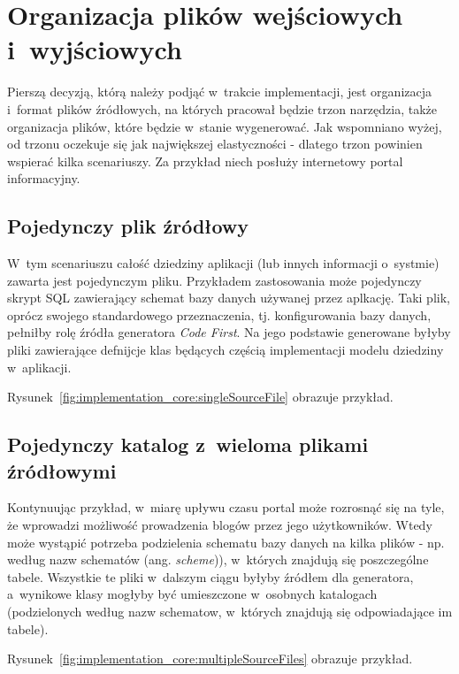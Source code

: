 \section{Organizacja plików wejściowych i~wyjściowych}

Pierszą decyzją, którą należy podjąć w~trakcie implementacji, jest organizacja i~format plików źródłowych, na których pracował będzie trzon narzędzia, także organizacja plików, które będzie w~stanie wygenerować.
Jak wspomniano wyżej, od trzonu oczekuje się jak największej elastyczności - dlatego trzon powinien wspierać kilka scenariuszy.
Za przykład niech posłuży internetowy portal informacyjny.


\subsection{Pojedynczy plik źródłowy}

W~tym scenariuszu całość dziedziny aplikacji (lub innych informacji o~systmie) zawarta jest pojedynczym pliku.
Przykładem zastosowania może pojedynczy skrypt SQL zawierający schemat bazy danych używanej przez aplkację.
Taki plik, oprócz swojego standardowego przeznaczenia, tj. konfigurowania bazy danych, pełniłby rolę źródła generatora \emph{Code First}.
Na jego podstawie generowane byłyby pliki zawierające defnijcje klas będących częścią implementacji modelu dziedziny w~aplikacji.

Rysunek~\ref{fig:implementation_core:singleSourceFile} obrazuje przykład.




\subsection{Pojedynczy katalog z~wieloma plikami źródłowymi}

Kontynuując przykład, w~miarę upływu czasu portal może rozrosnąć się na tyle, że wprowadzi możliwość prowadzenia blogów przez jego użytkowników.
Wtedy może wystąpić potrzeba podzielenia schematu bazy danych na kilka plików - np. według nazw schematów (ang. \emph{scheme})), w~których znajdują się poszczególne tabele.
Wszystkie te pliki w~dalszym ciągu byłyby źródłem dla generatora, a~wynikowe klasy mogłyby być umieszczone w~osobnych katalogach (podzielonych według nazw schematow, w~których znajdują się odpowiadające im tabele).

Rysunek~\ref{fig:implementation_core:multipleSourceFiles} obrazuje przykład.

